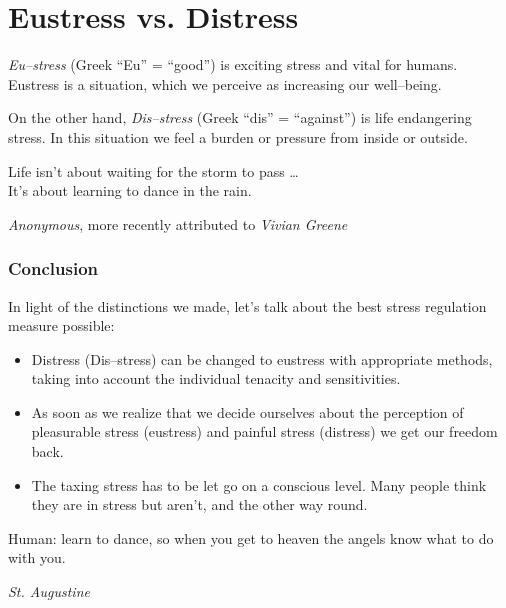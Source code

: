 \documentclass[../main.tex]{subfiles}
\begin{document}
\section{Eustress vs. Distress}

\emph{Eu--stress} (Greek ``Eu'' = ``good'') is exciting stress and vital for humans. 
Eustress is a situation, which we perceive as increasing our well--being. 

On the other hand, \emph{Dis--stress} (Greek ``dis'' = ``against'') is life endangering stress. In this situation we feel a burden or pressure from inside or outside.



\epigraph{Life isn't about waiting for the storm to pass \ldots  \\ 
It's about learning to dance in the rain.}{\textit{Anonymous}, more recently attributed to \textit{Vivian Greene}}


\subsubsection{Conclusion}
\noindent In light of the distinctions we made, let's talk about the best stress regulation measure possible:
\begin{itemize}
\item Distress (Dis--stress) can be changed to eustress with appropriate methods, taking into account the individual tenacity and sensitivities.
\item As soon as we realize that we decide ourselves about the perception of pleasurable stress (eustress) and painful stress (distress) we get our freedom back. 
\item The taxing stress has to be let go on a conscious level. Many people think they are in stress but aren't, and the other way round.
\end{itemize}

\epigraph{Human: learn to dance, so when you get to heaven the angels know what to do with you.}{\textit{St. Augustine}}


\end{document}
